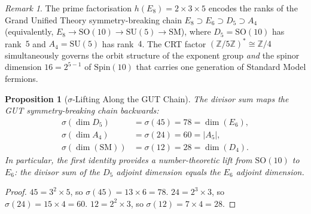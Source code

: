 \documentclass[11pt]{amsart}
\theoremstyle{plain}
\newtheorem{proposition}[theorem]{Proposition}
\theoremstyle{definition}
\theoremstyle{remark}
\newtheorem{remark}[theorem]{Remark}
\begin{document}
\begin{remark}\label{rem:GUT-chain}
The prime factorisation $h(E_8) = 2 \times 3 \times 5$ encodes the
ranks of the Grand Unified Theory symmetry-breaking chain
$E_8 \supset E_6 \supset D_5 \supset A_4$
(equivalently, $E_8 \to \mathrm{SO}(10) \to \mathrm{SU}(5) \to \mathrm{SM}$),
where $D_5 = \mathrm{SO}(10)$ has rank~$5$ and $A_4 = \mathrm{SU}(5)$ has
rank~$4$.  The CRT factor $(\mathbb{Z}/5\mathbb{Z})^* \cong \mathbb{Z}/4$
simultaneously governs the orbit structure of the exponent group
\emph{and} the spinor dimension $16 = 2^{5-1}$ of $\mathrm{Spin}(10)$
that carries one generation of Standard Model fermions.
\end{remark}

\begin{proposition}[$\sigma$-Lifting Along the GUT Chain]\label{prop:sigma-GUT-lift}
The divisor sum maps the GUT symmetry-breaking chain backwards:
\begin{align*}
  \sigma(\dim D_5) &= \sigma(45) = 78 = \dim(E_6), \\
  \sigma(\dim A_4) &= \sigma(24) = 60 = |A_5|, \\
  \sigma(\dim(\mathrm{SM})) &= \sigma(12) = 28 = \dim(D_4).
\end{align*}
In particular, the first identity provides a number-theoretic lift
from $\mathrm{SO}(10)$ to $E_6$: the divisor sum of the $D_5$ adjoint
dimension equals the $E_6$ adjoint dimension.
\end{proposition}

\begin{proof}
$45 = 3^2 \times 5$, so $\sigma(45) = 13 \times 6 = 78$.
$24 = 2^3 \times 3$, so $\sigma(24) = 15 \times 4 = 60$.
$12 = 2^2 \times 3$, so $\sigma(12) = 7 \times 4 = 28$.
\end{proof}
\end{document}

